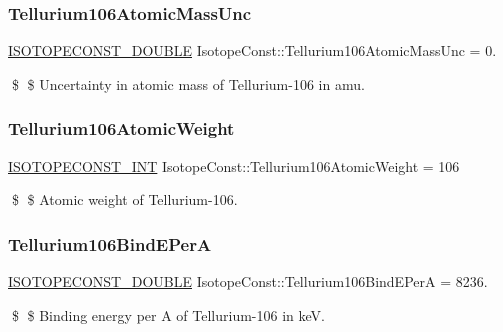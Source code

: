 \subsubsection{\texorpdfstring{Tellurium106\+Atomic\+Mass\+Unc}{Tellurium106AtomicMassUnc}}
{\footnotesize\ttfamily \mbox{\hyperlink{group___isotope_const-_macros_ga8f45a7272ce02c0b4c65c44636ed719a}{I\+S\+O\+T\+O\+P\+E\+C\+O\+N\+S\+T\+\_\+\+D\+O\+U\+B\+LE}} Isotope\+Const\+::\+Tellurium106\+Atomic\+Mass\+Unc = 0.}

\$ \$ Uncertainty in atomic mass of Tellurium-\/106 in amu. \mbox{\label{group___isotope_const-_tellurium-_te106_ga740865286a13a7ce8c84a46ae1623670}} 
\subsubsection{\texorpdfstring{Tellurium106\+Atomic\+Weight}{Tellurium106AtomicWeight}}
{\footnotesize\ttfamily \mbox{\hyperlink{group___isotope_const-_macros_ga5f18360b3e99483a35c32d789e62621c}{I\+S\+O\+T\+O\+P\+E\+C\+O\+N\+S\+T\+\_\+\+I\+NT}} Isotope\+Const\+::\+Tellurium106\+Atomic\+Weight = 106}

\$ \$ Atomic weight of Tellurium-\/106. \mbox{\label{group___isotope_const-_tellurium-_te106_ga845c4df31dacd2f75f32762d821015cb}} 
\subsubsection{\texorpdfstring{Tellurium106\+Bind\+E\+PerA}{Tellurium106BindEPerA}}
{\footnotesize\ttfamily \mbox{\hyperlink{group___isotope_const-_macros_ga8f45a7272ce02c0b4c65c44636ed719a}{I\+S\+O\+T\+O\+P\+E\+C\+O\+N\+S\+T\+\_\+\+D\+O\+U\+B\+LE}} Isotope\+Const\+::\+Tellurium106\+Bind\+E\+PerA = 8236.}

\$ \$ Binding energy per A of Tellurium-\/106 in keV. \mbox{\label{group___isotope_const-_tellurium-_te106_ga0f1fd37364d33564505274213a4257b3}} 
